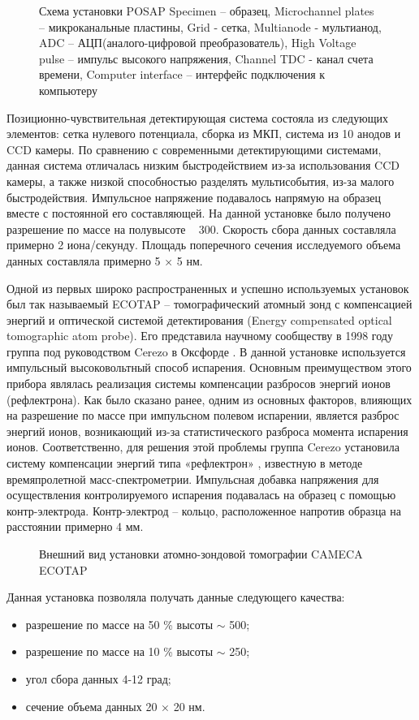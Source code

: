 \begin{figure}[htb]
	\caption{Схема установки POSAP \cite{Deconihout93} Specimen – образец, Microchannel plates – микроканальные пластины, Grid - сетка, Multianode - мультианод, ADC – АЦП(аналого-цифровой преобразователь), High Voltage pulse – импульс высокого напряжения, Channel TDC - канал счета времени, Computer interface – интерфейс подключения к компьютеру}
	\label{fig:POSAP}
\end{figure}

Позиционно-чувствительная детектирующая система состояла из следующих элементов: сетка нулевого потенциала, сборка из МКП, система из 10 анодов и CCD камеры. По сравнению с современными детектирующими системами, данная система отличалась низким быстродействием из-за использования CCD камеры, а также низкой способностью разделять мультисобытия, из-за малого быстродействия. Импульсное напряжение  подавалось напрямую на образец вместе с постоянной его составляющей. На данной установке было получено разрешение по массе на полувысоте ~ 300. Скорость сбора данных составляла примерно 2 иона/секунду. Площадь поперечного сечения исследуемого объема данных составляла примерно 5 × 5  нм.

Одной из первых широко распространенных и успешно используемых установок был так называемый ECOTAP – томографический атомный зонд с компенсацией энергий и оптической системой детектирования (Energy compensated optical tomographic atom probe). Его представила научному сообществу в 1998 году группа под руководством Cerezo в Оксфорде \cite{Cerezo98}. В данной установке используется импульсный высоковольтный способ испарения. Основным преимуществом этого прибора являлась реализация системы компенсации разбросов энергий ионов (рефлектрона). Как было сказано ранее, одним из основных факторов, влияющих на разрешение по массе при импульсном полевом испарении, является разброс энергий ионов, возникающий из-за статистического разброса момента испарения ионов. Соответственно, для решения этой проблемы группа Cerezo установила систему компенсации энергий типа «рефлектрон» , известную в методе времяпролетной масс-спектрометрии. Импульсная добавка напряжения для осуществления контролируемого испарения подавалась на образец с помощью контр-электрода. Контр-электрод – кольцо, расположенное напротив образца на расстоянии примерно 4 мм.

\begin{figure}[htb]
	\caption{Внешний вид установки атомно-зондовой томографии CAMECA ECOTAP}
	\label{fig:ECOTAP}
\end{figure}
Данная установка позволяла получать данные следующего качества:
\begin{itemize}[beginpenalty=10000] %
	\item разрешение по массе на 50 \% высоты  $\sim$ 500;
	\item разрешение по массе на 10 \% высоты $\sim$ 250;
	\item угол сбора данных 4-12 град;
	\item сечение объема данных 20 × 20 нм.  
\end{itemize}

